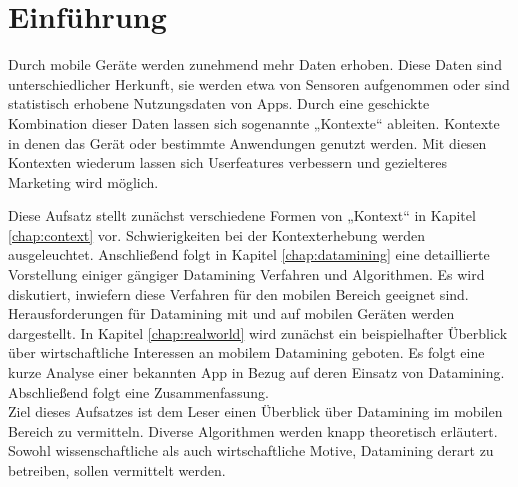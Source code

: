 \chapter{Einführung}

Durch mobile Geräte werden zunehmend mehr Daten erhoben. Diese Daten sind unterschiedlicher Herkunft, sie werden etwa von Sensoren aufgenommen oder sind statistisch erhobene Nutzungsdaten von Apps. Durch eine geschickte Kombination dieser Daten lassen sich sogenannte „Kontexte“ ableiten. Kontexte in denen das Gerät oder bestimmte Anwendungen genutzt werden. Mit diesen Kontexten wiederum lassen sich Userfeatures verbessern und gezielteres Marketing wird möglich.

Diese Aufsatz stellt zunächst verschiedene Formen von „Kontext“ in Kapitel \ref{chap:context} vor. Schwierigkeiten bei der Kontexterhebung werden ausgeleuchtet. Anschließend folgt in Kapitel \ref{chap:datamining} eine detaillierte Vorstellung einiger gängiger Datamining Verfahren und Algorithmen. Es wird diskutiert, inwiefern diese Verfahren für den mobilen Bereich geeignet sind. Herausforderungen für Datamining mit und auf mobilen Geräten werden dargestellt. In Kapitel \ref{chap:realworld} wird zunächst ein beispielhafter Überblick über wirtschaftliche Interessen an mobilem Datamining geboten. Es folgt eine kurze Analyse einer bekannten App in Bezug auf deren Einsatz von Datamining. Abschließend folgt eine Zusammenfassung. \\

Ziel dieses Aufsatzes ist dem Leser einen Überblick über Datamining im mobilen Bereich zu vermitteln. Diverse Algorithmen werden knapp theoretisch erläutert. Sowohl wissenschaftliche als auch wirtschaftliche Motive, Datamining derart zu betreiben, sollen vermittelt werden.

\nocite{*}